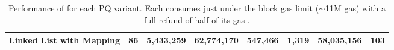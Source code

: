 \begin{table*}[t]
\begin{tabular} {|l|r|r|r|r|r|r|r|}
Linked List with Mapping     				& 86             		& 5,433,259                     	& 62,774,170        	&  547,466              				& 1,319					& 58,035,156					& 103									\\ \hline

\end{tabular}
\caption{Performance of \cm for each PQ variant. Each consumes just under the block gas limit ($\sim$11M gas) with a full refund of half of its gas .\label{tab:worst_case_matching}}

\end{table*}








